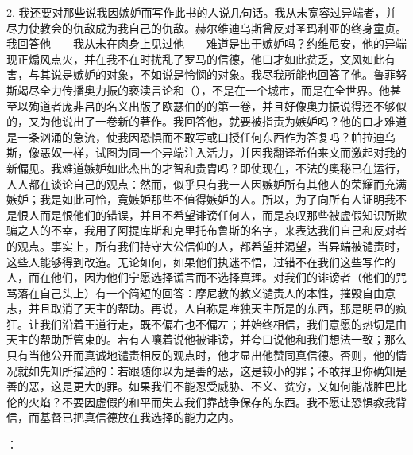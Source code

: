 2. 我还要对那些说我因嫉妒而写作此书的人说几句话。我从未宽容过异端者，并尽力使教会的仇敌成为我自己的仇敌。赫尔维迪乌斯曾反对圣玛利亚的终身童贞。我回答他——我从未在肉身上见过他——难道是出于嫉妒吗？约维尼安，他的异端现正煽风点火，并在我不在时扰乱了罗马的信德，他口才如此贫乏，文风如此有害，与其说是嫉妒的对象，不如说是怜悯的对象。我尽我所能也回答了他。鲁菲努斯竭尽全力传播奥力振的亵渎言论和（），不是在一个城市，而是在全世界。他甚至以殉道者庞非吕的名义出版了欧瑟伯的的第一卷，并且好像奥力振说得还不够似的，又为他说出了一卷新的著作。我回答他，就要被指责为嫉妒吗？他的口才难道是一条汹涌的急流，使我因恐惧而不敢写或口授任何东西作为答复吗？帕拉迪乌斯，像恶奴一样，试图为同一个异端注入活力，并因我翻译希伯来文而激起对我的新偏见。我难道嫉妒如此杰出的才智和贵胄吗？即使现在，不法的奥秘已在运行，人人都在谈论自己的观点：然而，似乎只有我一人因嫉妒所有其他人的荣耀而充满嫉妒；我是如此可怜，竟嫉妒那些不值得嫉妒的人。所以，为了向所有人证明我不是恨人而是恨他们的错误，并且不希望诽谤任何人，而是哀叹那些被虚假知识所欺骗之人的不幸，我用了阿提库斯和克里托布鲁斯的名字，来表达我们自己和反对者的观点。事实上，所有我们持守大公信仰的人，都希望并渴望，当异端被谴责时，这些人能够得到改造。无论如何，如果他们执迷不悟，过错不在我们这些写作的人，而在他们，因为他们宁愿选择谎言而不选择真理。对我们的诽谤者（他们的咒骂落在自己头上）有一个简短的回答：摩尼教的教义谴责人的本性，摧毁自由意志，并且取消了天主的帮助。再说，人自称是唯独天主所是的东西，那是明显的疯狂。让我们沿着王道行走，既不偏右也不偏左；并始终相信，我们意愿的热切是由天主的帮助所管束的。若有人嚷着说他被诽谤，并夸口说他和我们想法一致；那么只有当他公开而真诚地谴责相反的观点时，他才显出他赞同真信德。否则，他的情况就如先知所描述的：若跟随你以为是善的恶，这是较小的罪；不敢捍卫你确知是善的恶，这是更大的罪。如果我们不能忍受威胁、不义、贫穷，又如何能战胜巴比伦的火焰？不要因虚假的和平而失去我们靠战争保存的东西。我不愿让恐惧教我背信，而基督已把真信德放在我选择的能力之内。\newline{}\par


：\newline{}\par

